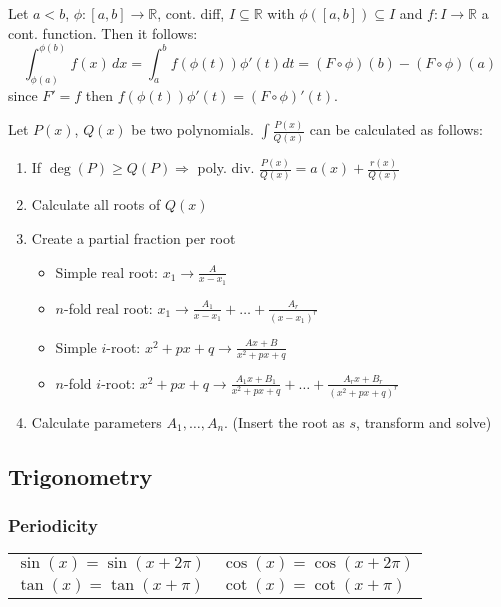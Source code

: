 \documentclass[a4paper, 10pt]{article}
\theoremstyle{definition}
\newcommand{\R}{\mathbb{R}}
\begin{document}
\begin{ntheorem*}[Substitution]
    Let $a < b$, $\phi: [a, b] \to \R$, cont. diff, $I \subseteq \R$ with $\phi([a, b]) \subseteq I$ and $f: I \to \R$ a cont. function. Then it follows:
    $$\int_{\phi(a)}^{\phi(b)} f(x) \,dx = \int_a^b f(\phi(t)) \phi'(t) dt = (F \circ \phi)(b) - (F \circ \phi)(a)$$
    since $F'=f$ then $f(\phi(t))\phi'(t) = (F \circ \phi)'(t)$.
\end{ntheorem*}

\begin{ntheorem*}
    Let $P(x)$, $Q(x)$ be two polynomials. $\int \frac{P(x)}{Q(x)}$ can be calculated as follows:
    \begin{enumerate}[leftmargin=5mm]
        \item If $\deg(P) \geq Q(P) \Rightarrow$ poly. div. $\frac{P(x)}{Q(x)} = a(x) + \frac{r(x)}{Q(x)}$
        \item Calculate all roots of $Q(x)$
        \item Create a partial fraction per root
        \begin{itemize}[leftmargin=1mm]
            \item Simple real root: $x_1 \to \frac{A}{x - x_1}$
            \item $n$-fold real root: $x_1 \to \frac{A_1}{x - x_1} + \ldots + \frac{A_r}{(x - x_1)^r}$
            \item Simple $i$-root: $x^2 + px + q \to \frac{Ax + B}{x^2 + px + q}$
            \item $n$-fold $i$-root: $x^2 + px + q \to \frac{A_1x + B_1}{x^2 + px + q} + \ldots + \frac{A_rx + B_r}{(x^2 + px + q)^r}$
        \end{itemize}
        \item Calculate parameters $A_1, \ldots, A_n$. (Insert the root as $s$, transform and solve)
    \end{enumerate}
\end{ntheorem*}

\subsection*{Trigonometry}

\subsubsection*{Periodicity}
\begin{tabularx}{\linewidth}{XX}
    $\sin(x) = \sin(x + 2 \pi)$ & $\cos(x) = \cos(x + 2\pi)$ \\
    $\tan(x) = \tan(x + \pi)$ & $\cot(x) = \cot(x + \pi)$
\end{tabularx}
\end{document}
